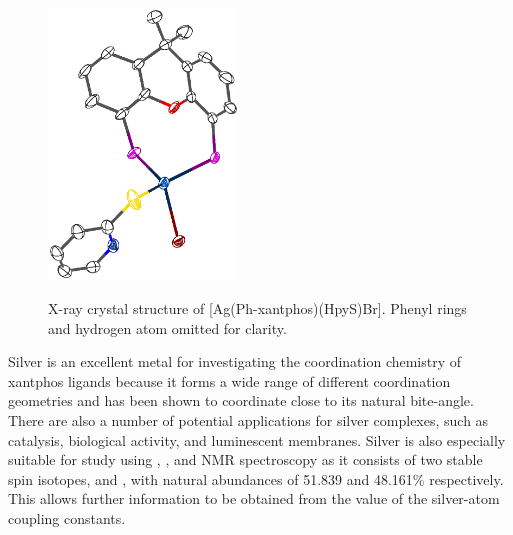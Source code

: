 \begin{figure}[htb] 
\begin{center}
\vspace{0.5cm}
\includegraphics[width=0.45\textwidth]{../Othercrystals/AgxantphosBrHpyS.eps}
\caption[X-ray crystal structure of Ag(Ph-xantphos)(HpyS)Br]{X-ray crystal structure of [Ag(Ph-xantphos)(HpyS)Br].\cite{Kaltzoglou2007} Phenyl rings and hydrogen atom omitted for clarity.}
\vspace{0.2cm}
\label{AgxantphosBrHpyS}
\end{center}
\end{figure}
\vspace{0.2cm}



Silver is an excellent metal for investigating the coordination chemistry of xantphos ligands because 
it forms a wide range of different coordination geometries and has been shown to coordinate \Phxantphos{} close to its natural bite-angle.\cite{Kaltzoglou2007}  There are also a number of potential applications for silver complexes, such as catalysis, biological activity, and luminescent membranes.  Silver is also especially suitable for study using \proton{}, \carbon{}, and \phosphorus{} NMR spectroscopy as it consists of two stable spin  isotopes, \Agseven{} and \Agnine{}, with natural abundances of 51.839 and 48.161\% respectively.  This allows further information to be obtained from the value of the silver-atom coupling constants. 

